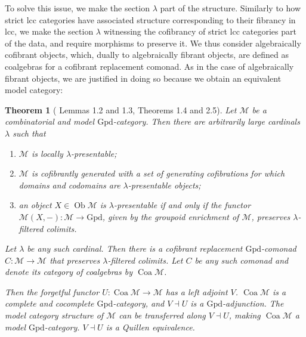 \documentclass[a4paper]{article}
\newtheorem{theorem}{Theorem}
\theoremstyle{remark}
\theoremstyle{definition}
\begin{document}
To solve this issue, we make the section $\lambda$ part of the structure.
Similarly to how strict lcc categories have associated structure corresponding to their fibrancy in lcc, we make the section $\lambda$ witnessing the cofibrancy of strict lcc categories part of the data, and require morphisms to preserve it.
We thus consider algebraically cofibrant objects, which, dually to algebraically fibrant objects, are defined as coalgebras for a cofibrant replacement comonad.
As in the case of algebraically fibrant objects, we are justified in doing so because we obtain an equivalent model category:

\begin{theorem}[\citet{coalgebraic-models} Lemmas 1.2 and 1.3, Theorems 1.4 and 2.5]
  \label{th:coalgebraic-model-category}
  Let $\mathcal{M}$ be a combinatorial and model $\mathrm{Gpd}$-category.
  Then there are arbitrarily large cardinals $\lambda$ such that
  \begin{enumerate}[label={(\arabic*)}]
    \item
      $\mathcal{M}$ is locally $\lambda$-presentable;
    \item
      $\mathcal{M}$ is cofibrantly generated with a set of generating cofibrations for which domains and codomains are $\lambda$-presentable objects;
    \item
      an object $X \in \operatorname{Ob} \mathcal{M}$ is $\lambda$-presentable if and only if the functor $\mathcal{M}(X, -) : \mathcal{M} \rightarrow \mathrm{Gpd}$, given by the groupoid enrichment of $\mathcal{M}$, preserves $\lambda$-filtered colimits.
  \end{enumerate}

  Let $\lambda$ be any such cardinal.
  Then there is a cofibrant replacement $\mathrm{Gpd}$-comonad $C : \mathcal{M} \rightarrow \mathcal{M}$ that preserves $\lambda$-filtered colimits. 
  Let $C$ be any such comonad and denote its category of coalgebras by $\operatorname{Coa} \mathcal{M}$.

  Then the forgetful functor $U : \operatorname{Coa} \mathcal{M} \rightarrow \mathcal{M}$ has a left adjoint $V$.
  $\operatorname{Coa} \mathcal{M}$ is a complete and cocomplete $\mathrm{Gpd}$-category, and $V \dashv U$ is a $\mathrm{Gpd}$-adjunction.
  The model category structure of $\mathcal{M}$ can be transferred along $V \dashv U$, making $\operatorname{Coa} \mathcal{M}$ a model $\mathrm{Gpd}$-category.
  $V \dashv U$ is a Quillen equivalence.
\end{theorem}
\end{document}
